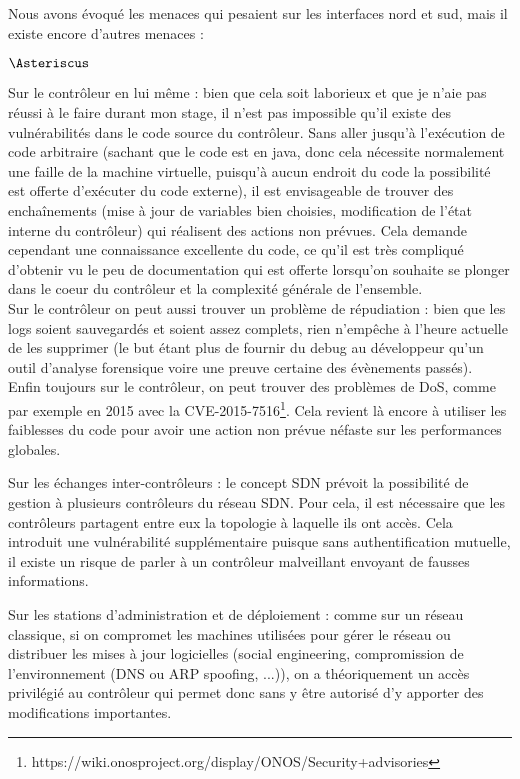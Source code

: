 Nous avons évoqué les menaces qui pesaient sur les interfaces nord et sud, mais il existe encore d'autres menaces :

\begin{list}{$\Asteriscus$}{}

\item Sur le contrôleur en lui même : bien que cela soit laborieux et que je n'aie pas réussi à le faire durant mon stage, il n'est pas impossible qu'il existe des vulnérabilités dans le code source du contrôleur. Sans aller jusqu'à l'exécution de code arbitraire (sachant que le code est en java, donc cela nécessite normalement une faille de la machine virtuelle, puisqu'à aucun endroit du code la possibilité est offerte d'exécuter du code externe), il est envisageable de trouver des enchaînements (mise à jour de variables bien choisies, modification de l'état interne du contrôleur) qui réalisent des actions non prévues. Cela demande cependant une connaissance excellente du code, ce qu'il est très compliqué d'obtenir vu le peu de documentation qui est offerte lorsqu'on souhaite se plonger dans le coeur du contrôleur et la complexité générale de l'ensemble.\\

Sur le contrôleur on peut aussi trouver un problème de répudiation : bien que les logs soient sauvegardés et soient assez complets, rien n'empêche à l'heure actuelle de les supprimer (le but étant plus de fournir du debug au développeur qu'un outil d'analyse forensique voire une preuve certaine des évènements passés).\\

Enfin toujours sur le contrôleur, on peut trouver des problèmes de DoS, comme par exemple en 2015 avec la CVE-2015-7516\footnote{https://wiki.onosproject.org/display/ONOS/Security+advisories}. Cela revient là encore à utiliser les faiblesses du code pour avoir une action non prévue néfaste sur les performances globales.

\item Sur les échanges inter-contrôleurs : le concept SDN prévoit la possibilité de gestion à plusieurs contrôleurs du réseau SDN. Pour cela, il est nécessaire que les contrôleurs partagent entre eux la topologie à laquelle ils ont accès. Cela introduit une vulnérabilité supplémentaire puisque sans authentification mutuelle, il existe un risque de parler à un contrôleur malveillant envoyant de fausses informations.

\item Sur les stations d'administration et de déploiement : comme sur un réseau classique, si on compromet les machines utilisées pour gérer le réseau ou distribuer les mises à jour logicielles (social engineering, compromission de l'environnement (DNS ou ARP spoofing, ...)), on a théoriquement un accès privilégié au contrôleur qui permet donc sans y être autorisé d'y apporter des modifications importantes.


\end{list}
